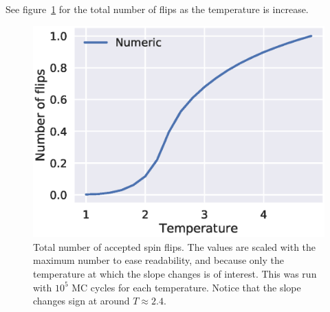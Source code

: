 \documentclass[aps,reprint]{revtex4-1}
\begin{document}
See figure~\ref{fig:4cFlips} for the total number of flips as the temperature
is increase.
\begin{figure}
  \includegraphics[width=\columnwidth]{figures/4c_number_of_flips.eps}
  \caption{Total number of accepted spin flips. The values are scaled with the
  maximum number to ease readability, and because only the temperature at which the
  slope changes is of interest. This was run with $10^5$ MC
  cycles for each temperature. Notice that the slope changes sign at around
  $T \approx 2.4$.}
  \label{fig:4cFlips}
\end{figure}
\end{document}
